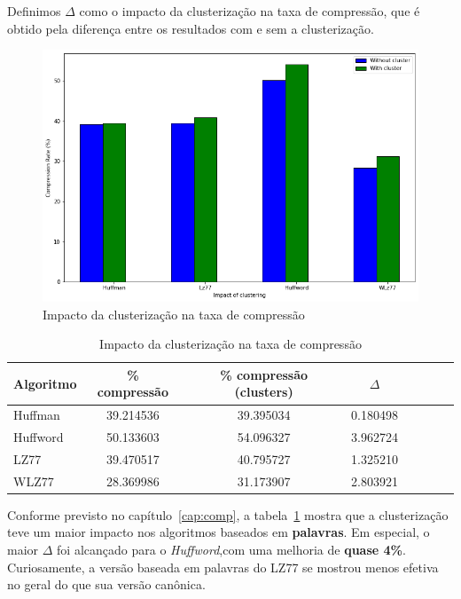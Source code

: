 Definimos $\Delta$ como o impacto da clusterização na taxa de compressão, que é obtido pela diferença entre os resultados com e sem a clusterização.
 \begin{figure}[H]
   \centering
   \includegraphics[scale=0.60]{figs/graphfinal.png}
    \caption{Impacto da clusterização na taxa de compressão}
    \label{fig:clusterfinalgraph}
 \end{figure}
 
 \begin{table}[H]
   \centering
   \caption{Impacto da clusterização na taxa de compressão} \label{tab:resultcomp}
   \begin{tabular}{|l|c|c|c|c|c|c|r|}
        \hline
        \small{Algoritmo} & \small{\% compressão} &  \small{\% compressão (clusters)} & \small{$\Delta$} \\ \hline
              Huffman   &   39.214536 & 39.395034 & 0.180498 \\ \hline
              Huffword  &   50.133603 & 54.096327 & 3.962724 \\ \hline
              LZ77        &   39.470517 & 40.795727 & 1.325210 \\ \hline
              WLZ77    &   28.369986 & 31.173907 & 2.803921 \\ \hline
  \end{tabular}
\end{table}

Conforme previsto no capítulo~\ref{cap:comp}, a tabela~\ref{tab:resultcomp} mostra que a clusterização teve um maior impacto nos algoritmos baseados em \textbf{palavras}.
Em especial, o maior $\Delta$ foi alcançado para o \emph{Huffword},com uma melhoria de \textbf{quase 4\%}. Curiosamente, a versão baseada em palavras do LZ77 se mostrou menos efetiva no geral do que sua versão canônica.

